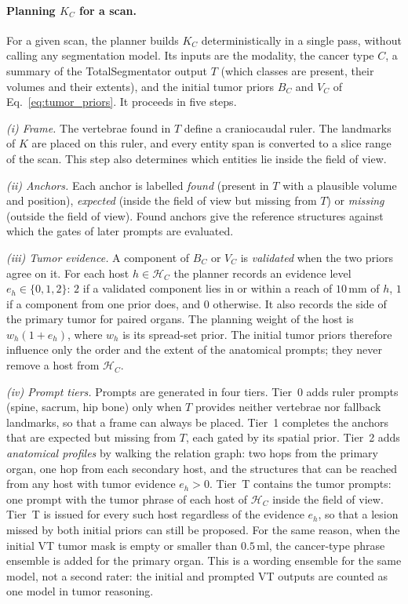 \documentclass[fleqn,10pt]{olplainarticle}
\begin{document}
\paragraph{Planning $K_C$ for a scan.}
For a given scan, the planner builds $K_C$ deterministically in a single pass, without calling any segmentation model.
Its inputs are the modality, the cancer type $C$, a summary of the TotalSegmentator output $T$ (which classes are
present, their volumes and their extents), and the initial tumor priors $B_C$ and $V_C$ of Eq.~\eqref{eq:tumor_priors}.
It proceeds in five steps.

\emph{(i) Frame.} The vertebrae found in $T$ define a craniocaudal ruler. The landmarks of $K$ are placed on this ruler,
and every entity span is converted to a slice range of the scan. This step also determines which entities lie inside the
field of view.

\emph{(ii) Anchors.} Each anchor is labelled \emph{found} (present in $T$ with a plausible volume and position),
\emph{expected} (inside the field of view but missing from $T$) or \emph{missing} (outside the field of view). Found
anchors give the reference structures against which the gates of later prompts are evaluated.

\emph{(iii) Tumor evidence.} A component of $B_C$ or $V_C$ is \emph{validated} when the two priors agree on it. For each
host $h\in\mathcal{H}_C$ the planner records an evidence level $e_h\in\{0,1,2\}$: $2$ if a validated component lies in
or within a reach of $10$\,mm of $h$, $1$ if a component from one prior does, and $0$ otherwise. It also records the
side of the primary tumor for paired organs. The planning weight of the host is $w_h(1+e_h)$, where $w_h$ is its
spread-set prior. The initial tumor priors therefore influence only the order and the extent of the anatomical
prompts; they never remove a host from $\mathcal{H}_C$.

\emph{(iv) Prompt tiers.} Prompts are generated in four tiers. Tier~0 adds ruler prompts (spine, sacrum, hip bone) only
when $T$ provides neither vertebrae nor fallback landmarks, so that a frame can always be placed. Tier~1 completes the anchors that are expected but missing from $T$, each gated by its
spatial prior. Tier~2 adds \emph{anatomical profiles} by walking the relation graph: two hops from the primary organ,
one hop from each secondary host, and the structures that can be reached from any host with tumor evidence
$e_h>0$. Tier~T contains the tumor prompts: one prompt with the tumor phrase of each host of $\mathcal{H}_C$ inside the
field of view. Tier~T is issued for every such host regardless of the evidence $e_h$, so that a lesion missed by both
initial priors can still be proposed. For the same reason, when the initial VT tumor mask is empty or smaller than
$0.5$\,ml, the cancer-type phrase ensemble is added for the primary organ. This is a wording ensemble for the same
model, not a second rater: the initial and prompted VT outputs are counted as one model in tumor reasoning.
\end{document}
